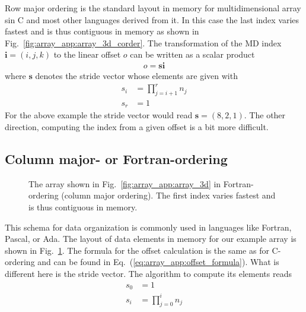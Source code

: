 Row major ordering is the standard layout in memory for multidimensional array
sin C and most other languages derived from it. In this case the last index
varies fastest and is thus contiguous in memory as shown in
Fig.~\ref{fig:array_app:array_3d_corder}. 
The transformation of the MD index $\mathbf{i}=(i,j,k)$ to the linear offset 
$o$ can be written as a scalar product 
\begin{align}\label{eq:array_app:offset_formula}
    o = \mathbf{s}\mathbf{i}
\end{align}
where $\mathbf{s}$ denotes the stride vector whose elements are given with
\begin{align}
    s_i &= \prod_{j=i+1}^r n_j \\
    s_r &= 1
\end{align}
For the above example the stride vector would read $\mathbf{s}=(8,2,1)$. 
The other direction, computing the index from a given offset is a bit more
difficult. 

\subsection{Column major- or Fortran-ordering}\label{sec:f_ordering}
\begin{figure}[tb]
\centering
\begin{minipage}{0.5\linewidth}
\centering
{}
\end{minipage}
\hfill
\begin{minipage}{0.4\linewidth}
\caption{{\small\label{fig:array_app:array_3d_forder}
The array shown in Fig.~\ref{fig:array_app:array_3d} in Fortran-ordering (column major
ordering). The first index varies fastest and is thus contiguous in memory. 
}}
\end{minipage}
\end{figure}
This schema for data organization is commonly used in languages like Fortran,
Pascal, or Ada. The layout of data elements in memory for our example array is
shown in Fig.~\ref{fig:array_app:array_3d_forder}. The formula for the offset
calculation is the same as for C-ordering and can be found  in
Eq.~(\ref{eq:array_app:offset_formula}). What is different here is the stride
vector. The algorithm to compute its elements reads
\begin{align}
    s_0 &= 1 \\
    s_i &= \prod_{j=0}^in_j
\end{align}

